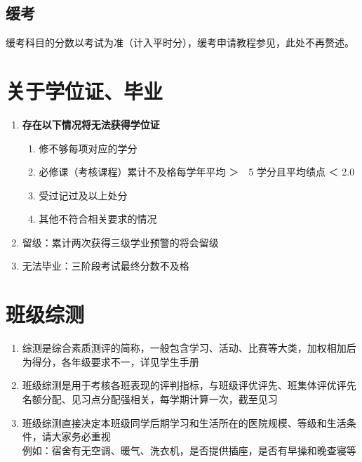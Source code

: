 \subsection[缓考]{缓考}
缓考科目的分数以考试为准（计入平时分），缓考申请教程参见，此处不再赘述。

\section[关于学位证、毕业]{关于学位证、毕业}
\begin{enumerate}
    \item \textbf{存在以下情况将无法获得学位证}
          \begin{enumerate}
              \item 修不够每项对应的学分
              \item 必修课（考核课程）累计不及格每学年平均 ＞　5 学分且平均绩点 ＜ 2.0
              \item 受过记过及以上处分
              \item 其他不符合相关要求的情况
          \end{enumerate}
    \item 留级：累计两次获得三级学业预警的将会留级
    \item 无法毕业：三阶段考试最终分数不及格
\end{enumerate}

\section[班级综测]{班级综测}
\label{class_evaluation}
\begin{enumerate}
    \item 综测是综合素质测评的简称，一般包含学习、活动、比赛等大类，加权相加后为得分，各年级要求不一，详见学生手册
    \item 班级综测是用于考核各班表现的评判指标，与班级评优评先、班集体评优评先名额分配、见习点分配\footnotemark 强相关，每学期计算一次，截至见习
    \item 班级综测直接决定本班级同学后期学习和生活所在的医院规模、等级和生活条件，请大家务必重视\\
          例如：宿舍有无空调、暖气、洗衣机，是否提供插座，是否有早操和晚查寝\footnotemark 等
\end{enumerate}


